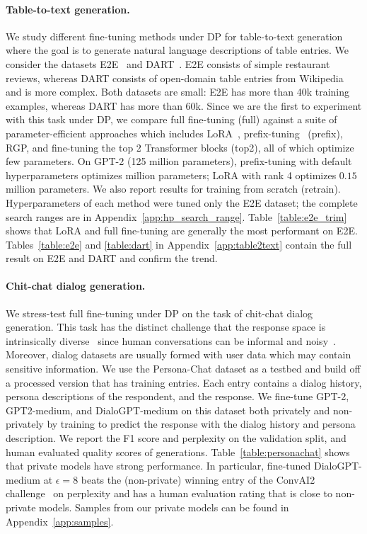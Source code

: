 \paragraph{Table-to-text generation.}
We study different fine-tuning methods under DP for table-to-text generation where the goal is to generate natural language descriptions of table entries. 
We consider the datasets E2E~\citep{novikova2017e2e} and DART~\citep{nan2020dart}. 
E2E consists of simple restaurant reviews, whereas DART consists of open-domain table entries from Wikipedia and is more complex. 
Both datasets are small: E2E has more than 40k training examples, whereas DART has more than 60k.
Since we are the first to experiment with this task under DP, we compare full fine-tuning (full) against a suite of parameter-efficient approaches which includes LoRA~\citep{hu2021lora}, prefix-tuning~\citep{li2021prefix} (prefix), RGP, and fine-tuning the top 2 Transformer blocks (top2), all of which optimize few parameters. 
On GPT-2 (125 million parameters), prefix-tuning with default hyperparameters optimizes  million parameters; LoRA with rank 4 optimizes \mytextapprox$0.15$  million parameters. 
We also report results for training from scratch (retrain).
Hyperparameters of each method were tuned only the E2E dataset; the complete search ranges are in Appendix~\ref{app:hp_search_range}.
Table~\ref{table:e2e_trim} shows that LoRA and full fine-tuning are generally the most performant on E2E. 
Tables~\ref{table:e2e} and \ref{table:dart} in Appendix~\ref{app:table2text} contain the full result on E2E and DART and confirm the trend.


\paragraph{Chit-chat dialog generation.}
We stress-test full fine-tuning under DP on the task of chit-chat dialog generation. This task has the distinct challenge that the response space is intrinsically diverse~\citep{li2015diversity,gao2018neural} since human conversations can be informal and noisy~\citep{zhang2019dialogpt}.
Moreover, dialog datasets are usually formed with user data which may contain sensitive information.
We use the Persona-Chat dataset \citep{zhang2018personalizing} as a testbed and build off a processed version that has  training entries.
Each entry contains a dialog history, persona descriptions of the respondent, and the response. 
We fine-tune GPT-2, GPT2-medium, and DialoGPT-medium on this dataset both privately and non-privately by training to predict the response with the dialog history and persona description. 
We report the F1 score and perplexity on the validation split, and human evaluated quality scores of generations.
Table~\ref{table:personachat} shows that private models have strong performance. 
In particular, fine-tuned DialoGPT-medium at $\epsilon=8$ beats the (non-private) winning entry of the ConvAI2 challenge~\citep{dinan2019second} on perplexity and has a human evaluation rating that is close to non-private models.
Samples from our private models can be found in Appendix~\ref{app:samples}.


